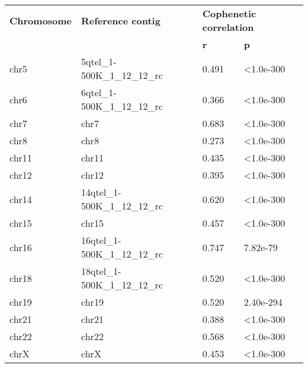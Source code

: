 \begin{samepage} \begin{table}[h!] \small \begin{tabular}{llll}
\hline
\textbf{Chromosome} & \textbf{Reference contig}       & \multicolumn{2}{l}{\textbf{Cophenetic correlation}} \\
\textbf{}           & \textbf{}                       & \textbf{r} & \textbf{p}                             \\
\hline
chr5                & 5qtel\_1-500K\_1\_12\_12\_rc    & 0.491      & <1.0e-300                              \\
chr6                & 6qtel\_1-500K\_1\_12\_12\_rc    & 0.366      & <1.0e-300                              \\
chr7                & chr7                            & 0.683      & <1.0e-300                              \\
chr8                & chr8                            & 0.273      & <1.0e-300                              \\
chr11               & chr11                           & 0.435      & <1.0e-300                              \\
chr12               & chr12                           & 0.395      & <1.0e-300                              \\
chr14               & 14qtel\_1-500K\_1\_12\_12\_rc   & 0.620      & <1.0e-300                              \\
chr15               & chr15                           & 0.457      & <1.0e-300                              \\
chr16               & 16qtel\_1-500K\_1\_12\_12\_rc   & 0.747      & 7.82e-79                               \\
chr18               & 18qtel\_1-500K\_1\_12\_12\_rc   & 0.520      & <1.0e-300                              \\
chr19               & chr19                           & 0.520      & 2.40e-294                              \\
chr21               & chr21                           & 0.388      & <1.0e-300                              \\
chr22               & chr22                           & 0.568      & <1.0e-300                              \\
chrX                & chrX                            & 0.453      & <1.0e-300                              \\
\hline
\end{tabular}
\caption{}
\label{}
\end{table}
\end{samepage}
